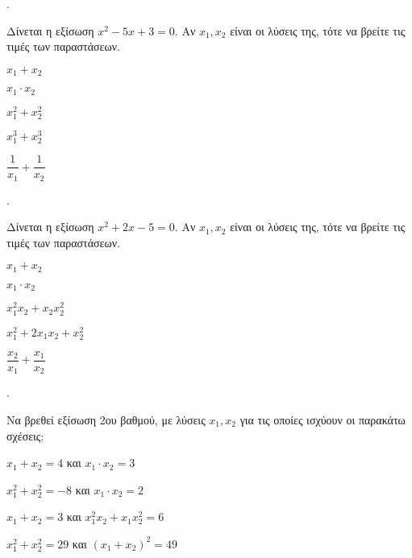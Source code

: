 \documentclass[11pt,a4paper,twocolumn]{article}
\newcounter{askhsh}
\newcommand{\askhsh}{{\large\theaskhsh.}\ \addtocounter{askhsh}{1}}
\begin{document}
\askhsh Δίνεται η εξίσωση $x^2-5x+3=0$. Αν $x_1,x_2$ είναι οι λύσεις της, τότε να βρείτε τις τιμές των παραστάσεων.
\begin{multicols}{2}
\begin{alist}
\item $x_1+x_2$
\item $x_1\cdot x_2$
\item $x_1^2+x_2^2$
\item $x_1^3+x_2^3$
\item $\dfrac{1}{x_1}+\dfrac{1}{x_2}$
\end{alist}
\end{multicols}
\askhsh Δίνεται η εξίσωση $x^2+2x-5=0$. Αν $x_1,x_2$ είναι οι λύσεις της, τότε να βρείτε τις τιμές των παραστάσεων.
\begin{multicols}{2}
\begin{alist}
\item $x_1+x_2$
\item $x_1\cdot x_2$
\item $x_1^2x_2+x_2x_2^2$
\item $ x_1^2+2x_1x_2+x_2^2 $
\item $\dfrac{x_2}{x_1}+\dfrac{x_1}{x_2}$
\end{alist}
\end{multicols}

\askhsh
Να βρεθεί εξίσωση 2ου βαθμού, με λύσεις $ x_1, x_2 $ για τις οποίες ισχύουν οι παρακάτω σχέσεις:
\begin{alist}
\item $ x_1+x_2=4 $ και $ x_1\cdot x_2=3 $
\item $ x_1^2+x_2^2=-8 $ και $ x_1\cdot x_2=2 $
\item $ x_1+x_2=3 $ και $ x_1^2x_2+x_1x_2^2=6 $
\item $ x_1^2+x_2^2=29 $ και $ (x_1+x_2)^2=49 $
\end{alist}
\end{document}
